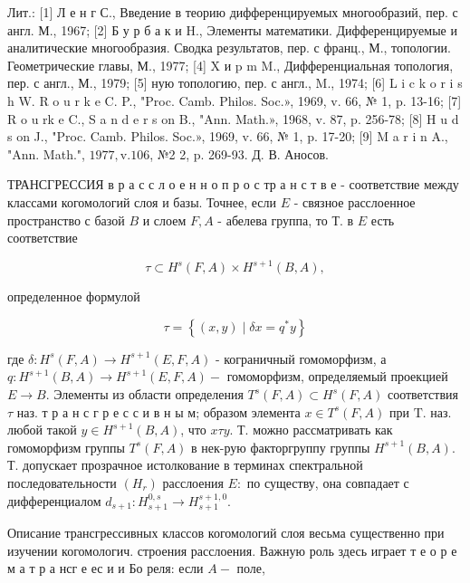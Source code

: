 \documentclass[10pt]{article}
\begin{document}
Лит.: [1] Л е н г С., Введение в теорию дифференцируемых многообразий, пер. с англ. М., 1967; [2] Б у р б а к и H., Элементы математики. Дифференцируемые и аналитические многообразия. Сводка результатов, пер. с франц., М., топологии. Геометрические главы, М., 1977; [4] X и p m M., Дифференциальная топология, пер. с англ., М., 1979; [5] ную топологию, пер. с англ., M., 1974; [6] L i c k o r i s h W. R o u r k e C. P., "Proc. Camb. Philos. Soc.», 1969, v. 66, № 1, p. 13-16; [7] R o u rk e C., S a n d e r s on B., "Ann. Math.», 1968, v. 87, p. 256-78; [8] H u d s on J., "Proc. Camb. Philos. Soc.», 1969, v. 66, № 1, p. 17-20; [9] M a r i n A., "Ann. Math.", $1977, \mathrm{v} .106$, №2 2, p. 269-93. Д. В. Аносов.



ТРАНСГРЕССИЯ в р а с с л о е н н о п р о с тр а н с т в е - соответствие между классами когомологий слоя и базы. Точнее, если $E$ - связное расслоенное пространство с базой $B$ и слоем $F, A$ - абелева группа, то Т. в $E$ есть соответствие



\[

\tau \subset H^{s}(F, A) \times H^{s+1}(B, A),

\]



определенное формулой



\[

\tau=\left\{(x, y) \mid \delta x=q^{*} y\right\}

\]



где $\delta: H^{s}(F, A) \rightarrow H^{s+1}(E, F, A)$ - кограничный гомоморфизм, а $q: H^{s+1}(B, A) \rightarrow H^{s+1}(E, F, A)-$ гомоморфизм, определяемый проекцией $E \rightarrow B$. Элементы из области определения $T^{s}(F, A) \subset H^{s}(F, A)$ соответствия $\tau$ наз. т р а н с г р е с с и в н ы м; образом элемента $x \in T^{s}(F, A)$ при $\mathrm{T}$. наз. любой такой $y \in H^{s+1}(B, A)$, что $x \tau y$. Т. можно рассматривать как гомоморфизм группы $T^{s}(F, A)$ в нек-рую факторгруппу группы $H^{s+1}(B, A)$. Т. допускает прозрачное истолкование в терминах спектральной последовательности $\left(H_{r}\right)$ расслоения $E:$ по существу, она совпадает с дифференциалом $d_{s+1}: H_{s+1}^{0, s} \rightarrow H_{s+1}^{s+1,0}$.



Описание трансгрессивных классов когомологий слоя весьма существенно при изучении когомологич. строения расслоения. Важную роль здесь играет т е о р е м а т р а нсг е ес и и Бо реля: если $A-$ поле,
\end{document}
